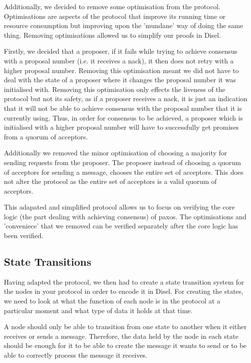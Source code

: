 Additionally, we decided to remove some optimisation from the protocol.
Optimisations are aspects of the protocol that improve its running time or
resource consumption but improving upon the 'mundane' way of doing the same
thing. Removing optimisations allowed us to simplify our proofs in Disel.

Firstly, we decided that a proposer, if it fails while trying to achieve
consensus with a proposal number (i.e. it receives a nack), it then does not
retry with a higher proposal number. Removing this optimisation meant we did not
have to deal with the state of a proposer where it changes the proposal number it
was initialised with. Removing this optimisation only
effects the liveness of the protocol but not its safety, as if a proposer
receives a nack, it is just an indication that it will not be able to achieve
consensus with the proposal number that it is currently using. Thus, in order
for consensus to be achieved, a proposer which is initialised with a higher
proposal number will have to successfully get promises from a quorum of acceptors.

Additionally we removed the minor optimisation of choosing a majority for
sending requests from the proposer. The proposer instead of choosing a
quorum of acceptors for sending a message, chooses the entire set of acceptors.
This does not alter the protocol as the entire set of acceptors is a valid
quorum of acceptors.

This adapated and simplified protocol allows us to focus on verifying the core
logic (the part dealing with achieving consensus) of paxos. The
optimisations and 'conveniece' that we removed can be verified separately after
the core logic has been verified.


\subsection{State Transitions}
Having adapted the protocol, we then had to create a state transition system for
the nodes in your protocol in order to encode it in Disel. For creating the states,
we need to look at what the function of each node is in the protocol at a particular
moment and what type of data it holds at that time.

A node should only be able to transition from one state to another when it either
receives or sends a message. Therefore, the data held by the node in each state
should be enough for it to be able to create the message it wants to send or to
be able to correctly process the message it receives.

